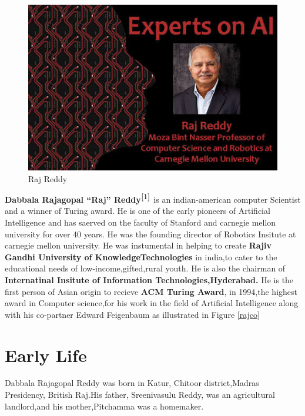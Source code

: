 \documentclass[a4paper,10pt]{article}
\begin{document}
\begin{figure}
 \includegraphics[scale=0.4]{raj.jpg}
 \caption{Raj Reddy}
\end{figure}

  \textbf{Dabbala Rajagopal ``Raj'' Reddy$^{\cite{1}}$} 
  is an indian-american computer 
  Scientist and a winner of Turing award. He is one of the early 
  pioneers of Artificial Intelligence and has saerved on the faculty 
  of Stanford and carnegie mellon university for over 40 years. He 
  was the founding director of Robotics Insitute at carnegie mellon university.
  He was instumental in helping to create {\bf Rajiv Gandhi University of 
  KnowledgeTechnologies} in india,to cater to the educational needs of 
  low-income,gifted,rural youth. He is also the chairman of 
  {\bf Internatinal Insitute of Information Technologies,Hyderabad.}
  He is the first person of Asian origin to recieve {\bf ACM Turing Award}, in 
  1994,the highest award in Computer science,for his work in the field of 
  Artificial Intelligence along with his co-partner Edward Feigenbaum as 
  illustrated in Figure \ref{rajco}
  
  
\section{Early Life}  
  Dabbala Rajagopal Reddy was born in Katur, Chitoor district,Madras Presidency,
  British Raj.His father, Sreenivasulu Reddy, was an agricultural landlord,and 
  his mother,Pitchamma was a  homemaker.                   
  
\end{document}
